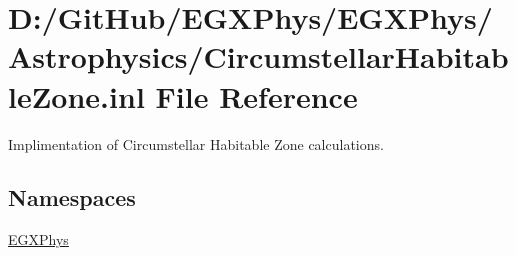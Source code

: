 \hypertarget{_circumstellar_habitable_zone_8inl}{}\section{D\+:/\+Git\+Hub/\+E\+G\+X\+Phys/\+E\+G\+X\+Phys/\+Astrophysics/\+Circumstellar\+Habitable\+Zone.inl File Reference}
\label{_circumstellar_habitable_zone_8inl}


Implimentation of Circumstellar Habitable Zone calculations.  


\subsection*{Namespaces}
\begin{DoxyCompactItemize}
\item 
 \mbox{\hyperlink{namespace_e_g_x_phys}{E\+G\+X\+Phys}}
\end{DoxyCompactItemize}
